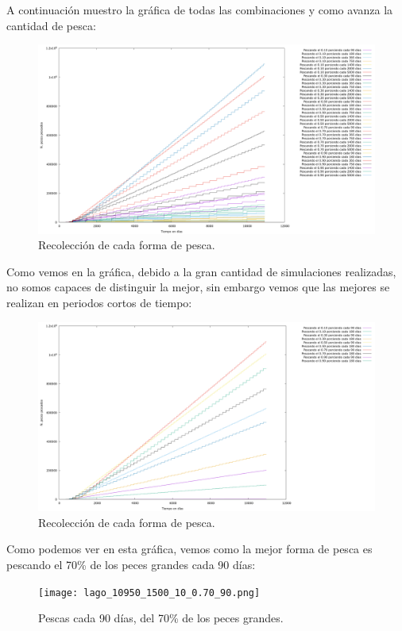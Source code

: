 \documentclass[12pt, spanish]{article}
\begin{document}
A continuación muestro la gráfica de todas las combinaciones y como avanza la cantidad de pesca:


\begin{figure}[H]
	\centering
	\includegraphics[scale = 0.25]{total.png}
	\caption{Recolección de cada forma de pesca.}
	\label{fig:ej4}
\end{figure}


Como vemos en la gráfica, debido a la gran cantidad de simulaciones realizadas, no somos capaces de distinguir la mejor, sin embargo vemos que las mejores se realizan en periodos cortos de tiempo:


\begin{figure}[H]
	\centering
	\includegraphics[scale = 0.25]{total_reducido.png}
	\caption{Recolección de cada forma de pesca.}
	\label{fig:ej4}
\end{figure}


Como podemos ver en esta gráfica, vemos como la mejor forma de pesca es pescando el 70\% de los peces grandes cada 90 días:


\begin{figure}[H]
	\centering
	\texttt{[image: lago\_10950\_1500\_10\_0.70\_90.png]}
	\caption{Pescas cada 90 días, del 70\% de los peces grandes.}
	\label{fig:ej4}
\end{figure}
\end{document}

